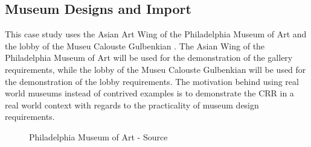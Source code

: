 \documentclass[12pt]{ucthesis}
\begin{document}



\subsection{Museum Designs and Import}
This case study uses the Asian Art Wing of the Philadelphia Museum of Art \cite{Philadelphia} and the lobby of the Museu Calouste Gulbenkian \cite{Gulbenkian}. The Asian Wing of the Philadelphia Museum of Art will be used for the demonstration of the gallery requirements, while the lobby of the Museu Calouste Gulbenkian will be used for the demonstration of the lobby requirements. The motivation behind using real world museums instead of contrived examples is to demonstrate the CRR in a real world context with regards to the practicality of museum design requirements.

\begin{figure}[H]
 \centering
 \hspace{10 mm}
 \caption{Philadelphia Museum of Art - Source \cite{philadelphiamusem}}
\label{art-museums}
\end{figure}
\end{document}
